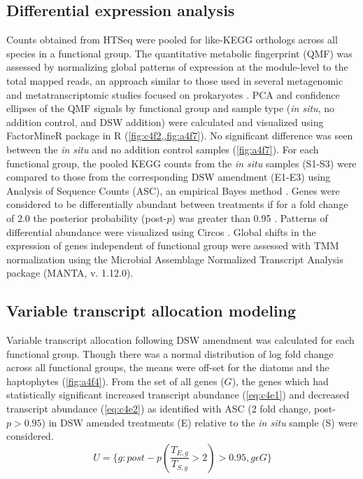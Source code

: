 \subsection{Differential expression analysis}
Counts obtained from HTSeq were pooled for like-KEGG orthologs across all species in a functional group. The quantitative metabolic fingerprint (QMF) was assessed by normalizing global patterns of expression at the module-level to the total mapped reads, an approach similar to those used in several metagenomic and metatranscriptomic studies focused on prokaryotes \citep{Shi2011, Ottesen2014, Shi2012}. PCA and confidence ellipses of the QMF signals by functional group and sample type (\textit{in situ}, no addition control, and DSW addition) were calculated and visualized using FactorMineR package in R (\cref{fig:c4f2,,fig:a4f7}). No significant difference was seen between the \textit{in situ} and no addition control samples (\cref{fig:a4f7}). For each functional group, the pooled KEGG counts from the \textit{in situ} samples (S1-S3) were compared to those from the corresponding DSW amendment (E1-E3) using Analysis of Sequence Counts (ASC), an empirical Bayes method \citep{Wu2010}. Genes were considered to be differentially abundant between treatments if for a fold change of 2.0 the posterior probability (post-$p$) was greater than 0.95 \citep{Dyhrman2012}. Patterns of differential abundance were visualized using Circos \citep{Krzywinski2009}. Global shifts in the expression of genes independent of functional group were assessed with TMM normalization using the Microbial Assemblage Normalized Transcript Analysis package (MANTA, v. 1.12.0)\citep{Marchetti2012a}. \par
\subsection{Variable transcript allocation modeling} 
Variable transcript allocation following DSW amendment was calculated for each functional group. Though there was a normal distribution of log fold change across all functional groups, the means were off-set for the diatoms and the haptophytes (\cref{fig:a4f4}). From the set of all genes ($G$), the genes which had statistically significant increased transcript abundance (\cref{eq:c4e1}) and decreased transcript abundance (\cref{eq:c4e2}) as identified with ASC (2 fold change, post-$p > 0.95$) \citep{Wu2010} in DSW amended treatments (E) relative to the \textit{in situ} sample (S) were considered. 
\begin{equation}
	\label{eq:c4e1}
	 U = \{g : post-p(\frac{T_{E,g}}{T_{S,g}} > 2) > 0.95, g \epsilon G\}
\end{equation}

